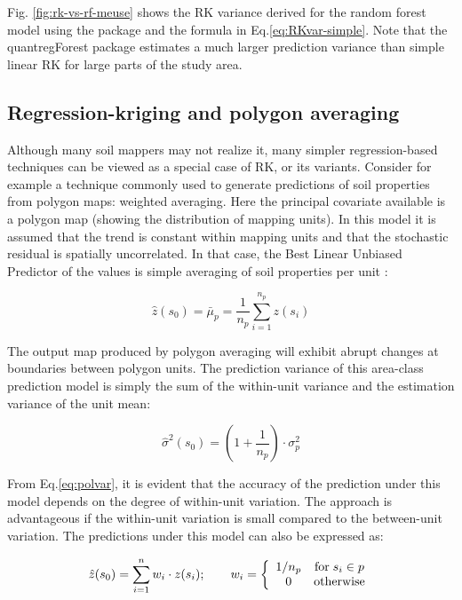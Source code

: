 \documentclass[graybox,natbib,nospthms,UStrade]{svmono}
\begin{document}
Fig. \ref{fig:rk-vs-rf-meuse} shows the RK variance derived
for the random forest model using the package \citep{meinshausen2006quantile}
and the formula in Eq.\eqref{eq:RKvar-simple}. Note that the quantregForest package
estimates a much larger prediction variance than simple linear RK for
large parts of the study area.

\hypertarget{regression-kriging-and-polygon-averaging}{%
\subsection{Regression-kriging and polygon averaging}\label{regression-kriging-and-polygon-averaging}}

Although many soil mappers may not realize it, many simpler
regression-based techniques can be viewed as a special case of RK, or
its variants. Consider for example a technique commonly used to generate
predictions of soil properties from polygon maps: weighted averaging.
Here the principal covariate available is a polygon map (showing the
distribution of mapping units). In this model it is assumed that the
trend is constant within mapping units and that the stochastic residual
is spatially uncorrelated. In that case, the Best Linear Unbiased
Predictor of the values is simple averaging of soil properties per
unit \citep[ p.43]{Webster2001Wiley}:

\begin{equation}
\hat z({{s}}_0 ) = \bar \mu _p  = \frac{1}{{n_p }}\sum\limits_{i = 1}^{n_p } {z({{s}}_i )}
\label{eq:regavg}
\end{equation}

The output map produced by polygon averaging will exhibit abrupt changes
at boundaries between polygon units. The prediction variance of this
area-class prediction model is simply the sum of the within-unit
variance and the estimation variance of the unit mean:

\begin{equation}
\hat \sigma^2 ({{s}}_0 ) = \left( 1 + \frac{1}{n_p } \right) \cdot \sigma _p^2
\label{eq:polvar}
\end{equation}

From Eq.\eqref{eq:polvar}, it is evident that the accuracy of the
prediction under this model depends on the degree of within-unit
variation. The approach is advantageous if the within-unit variation is
small compared to the between-unit variation. The predictions under this
model can also be expressed as:

\begin{equation}
\hat z({{s}}_0 ) = \sum\limits_{i = 1}^n {w_i  \cdot z({{s}}_i)}; \qquad w_i  = \left\{ {\begin{array}{*{20}c}
   {1/n_p } & {{\rm for} \; {{s}}_i \in p}  \\
   0 & {{\rm otherwise}}  \\
 \end{array} } \right.
\end{equation}
\end{document}
